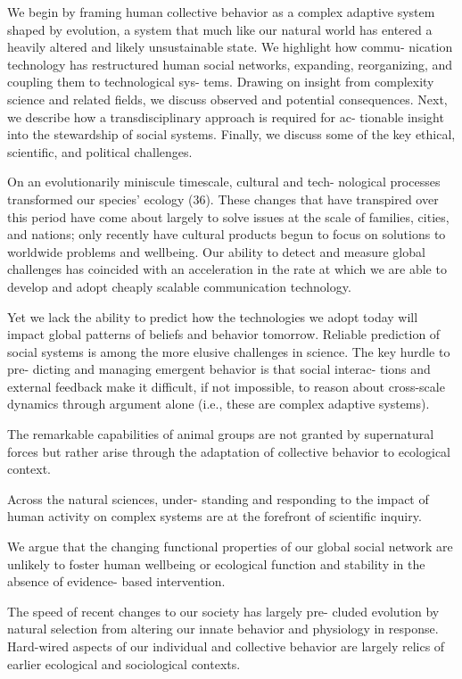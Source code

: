 \documentclass[
]{book}
\begin{document}
We begin by framing human collective behavior as a complex adaptive
system shaped by evolution, a system
that much like our natural world has entered a heavily altered and
likely unsustainable state.
We highlight how commu-
nication technology has restructured human social networks,
expanding, reorganizing, and coupling them to technological sys-
tems. Drawing on insight from complexity science and related
fields, we discuss observed and potential consequences. Next,
we describe how a transdisciplinary approach is required for ac-
tionable insight into the stewardship of social systems. Finally, we
discuss some of the key ethical, scientific, and political challenges.

On an evolutionarily miniscule timescale, cultural and tech-
nological processes transformed our species' ecology (36). These
changes that have transpired over this period have come about
largely to solve issues at the scale of families, cities, and nations;
only recently have cultural products begun to focus on solutions to
worldwide problems and wellbeing. Our ability to detect and
measure global challenges has coincided with an acceleration in
the rate at which we are able to develop and adopt cheaply
scalable communication technology.

Yet we lack the ability to predict how the technologies we
adopt today will impact global patterns of beliefs and behavior
tomorrow. Reliable prediction of social systems is among the
more elusive challenges in science.
The key hurdle to pre-
dicting and managing emergent behavior is that social interac-
tions and external feedback make it difficult, if not impossible, to
reason about cross-scale dynamics through argument alone (i.e.,
these are complex adaptive systems).

The remarkable capabilities of animal groups
are not granted by supernatural forces but rather arise through the
adaptation of collective behavior to ecological context.

Across the natural sciences, under-
standing and responding to the impact of human activity on
complex systems are at the forefront of scientific inquiry.

We argue that the changing functional properties of our
global social network are unlikely to foster human wellbeing or
ecological function and stability in the absence of evidence-
based intervention.

The speed of recent changes to our society has largely pre-
cluded evolution by natural selection from altering our innate
behavior and physiology in response. Hard-wired aspects of our
individual and collective behavior are largely relics of earlier
ecological and sociological contexts.
\end{document}
